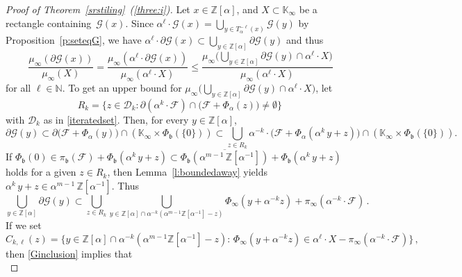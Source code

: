 \documentclass[12pt]{amsart}
\theoremstyle{definition}
\theoremstyle{remark}
\numberwithin{equation}{section}
\begin{document}
\begin{proof}[Proof of Theorem~\ref{srstiling}~(\ref{three:i})]
Let $x \in \mathbb{Z}[\alpha]$, and $X \subset \mathbb{K}_\infty$ be a rectangle containing~$\mathcal{G}(x)$. 
Since $\alpha^\ell \cdot \mathcal{G}(x) = \bigcup_{y \in T_\alpha^{-\ell}(x)} \mathcal{G}(y)$ by Proposition~\ref{p:seteqG}, we have $\alpha^\ell \cdot \partial\mathcal{G}(x) \subset \bigcup_{y\in\mathbb{Z}[\alpha]} \partial\mathcal{G}(y)$ and thus
\begin{equation} \label{e:muXB}
\frac{\mu_\infty(\partial\mathcal{G}(x))}{\mu_\infty(X)} = \frac{\mu_\infty(\alpha^\ell\cdot\partial\mathcal{G}(x))}{\mu_\infty(\alpha^\ell\cdot X)} \le \frac{\mu_\infty\big(\bigcup_{y\in\mathbb{Z}[\alpha]} \partial\mathcal{G}(y) \cap \alpha^\ell \cdot X\big)}{\mu_\infty(\alpha^\ell \cdot X)}
\end{equation}
for all $\ell \in \mathbb{N}$. 
To get an upper bound for $\mu_\infty\big(\bigcup_{y\in\mathbb{Z}[\alpha]} \partial\mathcal{G}(y) \cap \alpha^\ell \cdot X\big)$, let 
\[
R_k = \big\{z \in \mathcal{D}_k: \partial(\alpha^k \cdot \mathcal{F}) \cap \big(\mathcal{F} + \Phi_\alpha(z)\big) \neq \emptyset\big\}\,
\]
with $\mathcal{D}_k$ as in \eqref{iteratedset}.
Then, for every $y \in \mathbb{Z}[\alpha]$,
\[
\partial\mathcal{G}(y) \subset \partial\big(\mathcal{F} +  \Phi_\alpha(y)\big) \cap (\mathbb{K}_\infty \times \Phi_\mathfrak{b}(\{0\})) \subset \bigcup_{z\in R_k} \alpha^{-k} \cdot \big(\mathcal{F} + \Phi_\alpha(\alpha^k\, y+z)\big) \cap (\mathbb{K}_\infty \times \Phi_\mathfrak{b}(\{0\})).
\]
If $\Phi_\mathfrak{b}(0) \in \pi_\mathfrak{b}(\mathcal{F}) + \Phi_\mathfrak{b}(\alpha^k\, y+z) \subset  \overline{\Phi_\mathfrak{b}(\alpha^{m-1}\,\mathbb{Z}[\alpha^{-1}])} + \Phi_\mathfrak{b}(\alpha^k\, y+z)$ holds for a given $z \in R_k$, then Lemma~\ref{l:boundedaway} yields $\alpha^k\, y + z \in \alpha^{m-1}\,\mathbb{Z}[\alpha^{-1}]$. Thus
\begin{equation}\label{Ginclusion}
\bigcup_{y\in\mathbb{Z}[\alpha]} \partial\mathcal{G}(y) \subset \bigcup_{z\in R_k} \bigcup_{y\in \mathbb{Z}[\alpha] \cap \alpha^{-k} (\alpha^{m-1}\mathbb{Z}[\alpha^{-1}]-z)} \Phi_\infty(y + \alpha^{-k} z) + \pi_\infty(\alpha^{-k} \cdot \mathcal{F})\,.
\end{equation}
If we set
\[
C_{k,\ell}(z) = \{y \in \mathbb{Z}[\alpha] \cap \alpha^{-k} (\alpha^{m-1}\mathbb{Z}[\alpha^{-1}]-z):\, \Phi_\infty(y + \alpha^{-k} z) \in \alpha^\ell \cdot X - \pi_\infty(\alpha^{-k} \cdot \mathcal{F})\big\}\,,
\]
then \eqref{Ginclusion} implies that
\begin{equation}\label{Ginclusion2}

\end{equation}
\end{proof}
\end{document}
